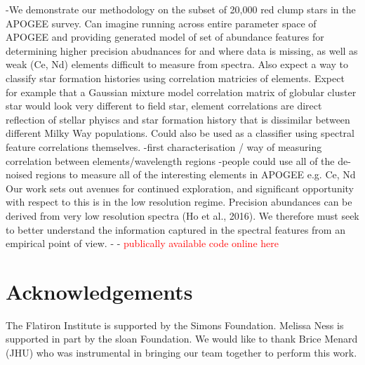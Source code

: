 \documentclass[a4paper,fleqn,usenatbib]{mnras}
\begin{document}
-We demonstrate our methodology on the subset of 20,000 red clump stars in the APOGEE survey. Can imagine running across entire parameter space of APOGEE and providing generated model of set of abundance features for determining higher precision abudnances for and where data is missing, as well as weak (Ce, Nd) elements difficult to measure from spectra. Also expect a way to classify star formation histories using correlation matricies of elements. Expect for example that a Gaussian mixture model correlation matrix of globular cluster star would look very different to field star, element correlations are direct reflection of stellar phyiscs and star formation history that is dissimilar between different Milky Way populations. Could also be used as a classifier using spectral feature correlations themselves. 
-first characterisation / way of measuring correlation between elements/wavelength regions
-people could use all of the de-noised regions to measure all of the interesting elements in APOGEE e.g. Ce, Nd
Our work sets out avenues for continued exploration, and significant opportunity with respect to this is in the low resolution regime. Precision abundances can be derived from very low resolution spectra (Ho et al., 2016). We therefore must seek to better understand the information captured in the spectral features from an empirical point of view. 
-
- \textcolor{red}{publically available code online here} 



\section*{Acknowledgements}

The Flatiron Institute is supported by the Simons Foundation.
Melissa Ness is supported in part by the sloan Foundation. We would like to thank Brice Menard (JHU) who was instrumental in bringing our team together to perform this work. 


%



\bsp	%
\label{lastpage}
\end{document}
